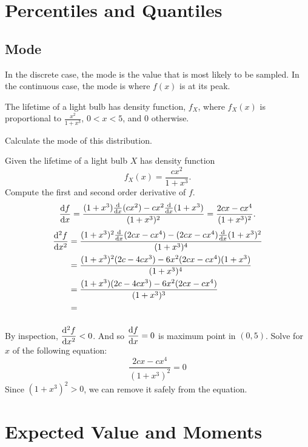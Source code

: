\section{Percentiles and Quantiles}

\subsection{Mode}
In the discrete case, the mode is the value that is most likely to be sampled. In the continuous 
case, the mode is where $f(x)$ is at its peak.

\begin{example}
    The lifetime of a light bulb has density function, $f_X$, where $f_X(x)$ is proportional to 
    $\displaystyle \frac{x^2}{1 + x^3}$, $0 < x < 5$, and 0 otherwise.

    Calculate the mode of this distribution.
\end{example}
\begin{solution}
    Given the lifetime of a light bulb $X$ has density function
    \[
        f_X(x) =  \frac{cx^2}{1 + x^3}.
    \]
    Compute the first and second order derivative of $f$.
    \begin{align*}
        \odv{f}{x} = \frac{(1+x^3) \odv*{}{x} (cx^2) - cx^2 \odv*{}{x}(1+x^3)}{(1+x^3)^2}
        = \frac{2cx-cx^4}{(1+x^3)^2}.
    \end{align*}
    \begin{align*}
        \odv[order=2]{f}{x} &= \frac{(1+x^3)^2 \odv*{}{x} (2cx - cx^4) - (2cx - cx^4) \odv*{}{x}(1+x^3)^2}{(1+x^3)^4}\\
        &= \frac{(1+x^3)^2 (2c - 4cx^3) - 6x^2(2cx - cx^4)(1+x^3)}{(1+x^3)^4}\\
        &= \frac{(1+x^3) (2c - 4cx^3) - 6x^2(2cx - cx^4)}{(1+x^3)^3}\\
        &= \frac{}{}
    \end{align*}
\end{solution}

By inspection, $\displaystyle \odv[order=2]{f}{x} < 0$. And so $\displaystyle \odv{f}{x} = 0$ is maximum point in $(0, 5)$. Solve 
for $x$ of the following equation:
\[
\frac{2cx-cx^4}{(1+x^3)^2} = 0 
\]
Since $(1+x^3)^2 > 0$, we can remove it safely from the equation.

\section{Expected Value and Moments}

